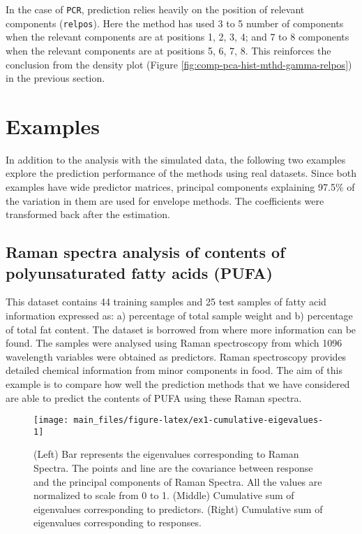 \documentclass[12pt,3p,authoryear]{elsarticle}
\begin{document}
In the case of \texttt{PCR}, prediction relies heavily on the position
of relevant components (\texttt{relpos}). Here the method has used 3 to
5 number of components when the relevant components are at positions 1,
2, 3, 4; and 7 to 8 components when the relevant components are at
positions 5, 6, 7, 8. This reinforces the conclusion from the density
plot (Figure \ref{fig:comp-pca-hist-mthd-gamma-relpos}) in the previous
section.

\section{Examples}\label{examples}

In addition to the analysis with the simulated data, the following two
examples explore the prediction performance of the methods using real
datasets. Since both examples have wide predictor matrices, principal
components explaining 97.5\% of the variation in them are used for
envelope methods. The coefficients were transformed back after the
estimation.

\subsection{Raman spectra analysis of contents of polyunsaturated fatty
acids
(PUFA)}\label{raman-spectra-analysis-of-contents-of-polyunsaturated-fatty-acids-pufa}

This dataset contains 44 training samples and 25 test samples of fatty
acid information expressed as: a) percentage of total sample weight and
b) percentage of total fat content. The dataset is borrowed from
\citet{naes2013multi} where more information can be found. The samples
were analysed using Raman spectroscopy from which 1096 wavelength
variables were obtained as predictors. Raman spectroscopy provides
detailed chemical information from minor components in food. The aim of
this example is to compare how well the prediction methods that we have
considered are able to predict the contents of PUFA using these Raman
spectra.








\begin{figure}
\texttt{[image: main\_files/figure-latex/ex1-cumulative-eigevalues-1]} \caption{(Left) Bar represents the eigenvalues
corresponding to Raman Spectra. The points and line are the covariance
between response and the principal components of Raman Spectra. All the
values are normalized to scale from 0 to 1. (Middle) Cumulative sum of
eigenvalues corresponding to predictors. (Right) Cumulative sum of
eigenvalues corresponding to responses.}\label{fig:ex1-cumulative-eigevalues}
\end{figure}
\end{document}
